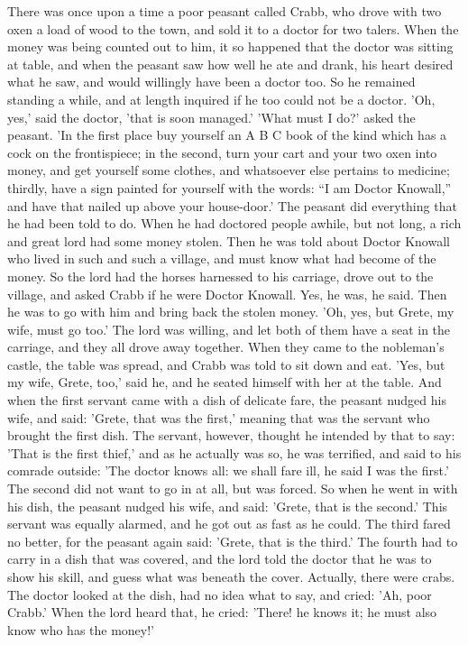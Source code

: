 \documentclass[12pt]{book}
\begin{document}
There was once upon a time a poor peasant called Crabb, who drove with
two oxen a load of wood to the town, and sold it to a doctor for two
talers. When the money was being counted out to him, it so happened
that the doctor was sitting at table, and when the peasant saw how
well he ate and drank, his heart desired what he saw, and would
willingly have been a doctor too. So he remained standing a while, and
at length inquired if he too could not be a doctor. 'Oh, yes,' said
the doctor, 'that is soon managed.' 'What must I do?' asked the
peasant. 'In the first place buy yourself an A B C book of the kind
which has a cock on the frontispiece; in the second, turn your cart
and your two oxen into money, and get yourself some clothes, and
whatsoever else pertains to medicine; thirdly, have a sign painted for
yourself with the words: ``I am Doctor Knowall,'' and have that nailed
up above your house-door.' The peasant did everything that he had been
told to do. When he had doctored people awhile, but not long, a rich
and great lord had some money stolen. Then he was told about Doctor
Knowall who lived in such and such a village, and must know what had
become of the money. So the lord had the horses harnessed to his
carriage, drove out to the village, and asked Crabb if he were Doctor
Knowall. Yes, he was, he said. Then he was to go with him and bring
back the stolen money. 'Oh, yes, but Grete, my wife, must go too.' The
lord was willing, and let both of them have a seat in the carriage,
and they all drove away together. When they came to the nobleman's
castle, the table was spread, and Crabb was told to sit down and eat.
'Yes, but my wife, Grete, too,' said he, and he seated himself with
her at the table. And when the first servant came with a dish of
delicate fare, the peasant nudged his wife, and said: 'Grete, that was
the first,' meaning that was the servant who brought the first dish.
The servant, however, thought he intended by that to say: 'That is the
first thief,' and as he actually was so, he was terrified, and said to
his comrade outside: 'The doctor knows all: we shall fare ill, he said
I was the first.' The second did not want to go in at all, but was
forced. So when he went in with his dish, the peasant nudged his wife,
and said: 'Grete, that is the second.' This servant was equally
alarmed, and he got out as fast as he could. The third fared no
better, for the peasant again said: 'Grete, that is the third.' The
fourth had to carry in a dish that was covered, and the lord told the
doctor that he was to show his skill, and guess what was beneath the
cover. Actually, there were crabs. The doctor looked at the dish, had
no idea what to say, and cried: 'Ah, poor Crabb.' When the lord heard
that, he cried: 'There! he knows it; he must also know who has the
money!'
\end{document}
